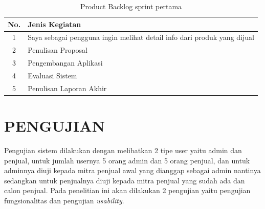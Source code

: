 \begin{enumerate}
	\begin{table}[H]
		\begin{center}
		\caption{Product Backlog sprint pertama}
		\label{tab:jadwal}
		\begin{tabular}{|c|l|}
		\hline
		No.&Jenis Kegiatan\\
		\hline
		1&Saya sebagai pengguna ingin melihat detail info dari produk yang dijual\\
		\hline
		2&Penulisan Proposal\\
		\hline
		3&Pengembangan Aplikasi\\
		\hline
		4&Evaluasi Sistem\\
		\hline
		5&Penulisan Laporan Akhir\\
		\hline
		\end{tabular}
		\end{center}
	\end{table}
\end{enumerate}

\section{\uppercase{Pengujian}}
Pengujian sistem dilakukan dengan melibatkan 2 tipe user yaitu admin dan penjual, untuk jumlah usernya 5 orang admin dan 5 orang penjual, dan untuk adminnya diuji kepada mitra penjual awal yang dianggap sebagai admin nantinya sedangkan untuk penjualnya diuji kepada mitra penjual yang sudah ada dan calon penjual. Pada penelitian ini akan dilakukan 2 pengujian yaitu pengujian fungsionalitas dan pengujian \textit{usability}.

